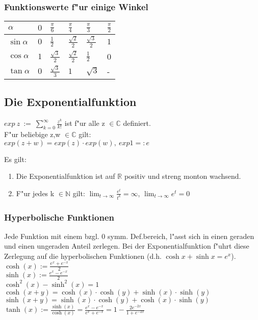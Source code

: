 \documentclass[10pt, a4paper, twocolumn]{scrartcl}
\begin{document}
\subsubsection{Funktionswerte f"ur einige Winkel}

\begin{tabular}{l|lllll}
 $\alpha$ &		$0$ &		$\frac{\pi}{6}$ &	$\frac{\pi}{4}$ &	$\frac{\pi}{3}$ &	$\frac{\pi}{2}$\\\hline
 $\sin\alpha$ &		$0$ &		$\frac{1}{2}$ &		$\frac{\sqrt{2}}{2}$ &	$\frac{\sqrt{3}}{2}$ &	$1$\\
 $\cos\alpha$ &		$1$ &		$\frac{\sqrt{3}}{2}$ & 	$\frac{\sqrt{2}}{2}$ &	$\frac{1}{2}$ &		0\\
 $\tan\alpha$ &		$0$ &		$\frac{\sqrt{3}}{3}$ &	$1$ &			$\sqrt{3}$ &		-
\end{tabular}

\subsection{Die Exponentialfunktion}
$exp\:z\::=\:\sum^\infty_{k=0}\frac{z^k}{k!}$ ist f"ur alle z $\in \mathbb{C}$ definiert.\\
F"ur beliebige z,w $\in \mathbb{C}$ gilt:\\
$exp(z+w) = exp(z)\cdotp exp(w),\:exp 1=:e$

Es gilt:
\begin{enumerate}
 \item Die Exponentialfunktion ist auf $\mathbb{R}$ positiv und streng monton wachsend.
 \item F"ur jedes k $\in \mathbb{N}$ gilt: $\lim_{t\to\infty}\frac{e^t}{t^k}=\infty$, $\lim_{t \to \infty}e^t=0$
\end{enumerate}

\subsubsection{Hyperbolische Funktionen}

Jede Funktion mit einem bzgl. 0 symm. Def.bereich, l"asst sich in einen geraden und einen ungeraden Anteil zerlegen. Bei der Exponentialfunktion f"uhrt diese Zerlegung auf die hyperbolischen Funktionen (d.h. $\cosh x+\sinh x=e^x$).\\

$\cosh(x):=\frac{e^x+e^{-x}}{2}$\\
$\sinh(x):=\frac{e^x-e^{-x}}{2}$\\
$\cosh^2(x)-\sinh^2(x)=1$\\
$\cosh(x+y)=\cosh(x)\cdotp\cosh(y)+\sinh(x)\cdotp\sinh(y)$\\
$\sinh(x+y)=\sinh(x)\cdotp\cosh(y)+\cosh(x)\cdotp\sinh(y)$\\
$\tanh(x):=\frac{\sinh(x)}{\cosh(x)}=\frac{e^x-e^{-x}}{e^x+e^{-x}}=1-\frac{2e^{-2x}}{1+e^{-2x}}$
\end{document}
